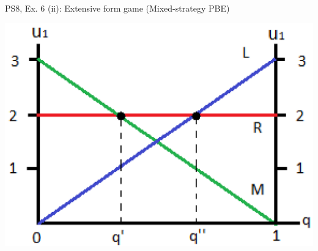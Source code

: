 \begin{frame}{PS8, Ex. 6 (ii): Extensive form game (Mixed-strategy PBE)}
\begin{multicols}{2}
\begin{figure}[!h]
      \end{figure}
      \includegraphics[width=1.1\columnwidth]{figures/Gibbons_4_2_E[u]}
      \vfill\null
    \end{multicols}
\end{frame}
